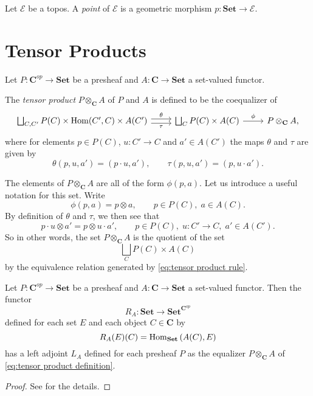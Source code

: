 \begin{definition}
\label{def:point of a topos}
Let $\mathscr{E}$ be a topos. A \emph{point} of $\mathscr{E}$ is a geometric morphism $p : \mathbf{Set} \to \mathscr{E}$.
\end{definition}

\section{Tensor Products} %
\label{sub:tensor_products}
Let $P : \mathbf{C}^{op} \to \mathbf{Set}$ be a presheaf and $A : \mathbf{C} \to \mathbf{Set}$ a set-valued functor.

\begin{definition}
\label{def:tensor product}
The \emph{tensor product} $P \otimes_{\mathbf{C}} A$ of $P$ and $A$ is defined to be the coequalizer of
\begin{equation}
\label{eq:tensor product definition}
\begin{tikzcd}
\bigsqcup_{C,C'} P(C) \times \Hom(C',C) \times A(C') \arrow[shift left=0.25em]{r}{\theta} \arrow[swap, shift right=0.25em]{r}{\tau} & \bigsqcup_{C} P(C) \times A(C) \arrow{r}{\phi} & P \otimes_{\mathbf{C}} A,
\end{tikzcd}
\end{equation}
where for elements $p \in P(C)$, $u : C' \to C$ and $a' \in A(C')$ the maps $\theta$ and $\tau$ are given by
\[ \theta(p,u,a') = (p \cdot u, a'), \qquad \tau(p,u,a') = (p, u \cdot a'). \]
\end{definition}
The elements of $P \otimes_{\mathbf{C}} A$ are all of the form $\phi(p,a)$. Let us introduce a useful notation for this set. Write
\[ \phi(p,a) = p \otimes a, \qquad p \in P(C), \; a \in A(C). \]
By definition of $\theta$ and $\tau$, we then see that
\begin{equation}
\label{eq:tensor product rule}
p \cdot u \otimes a' = p \otimes u \cdot a', \qquad p \in P(C), \; u : C' \to C, \; a' \in A(C').
\end{equation}
So in other words, the set $P \otimes_{\mathbf{C}} A$ is the quotient of the set
\[ \bigsqcup_{C} P(C) \times A(C) \]
by the equivalence relation generated by \cref{eq:tensor product rule}.

\begin{theorem}
\label{thm:hom-tensor-adjunction}
Let $P : \mathbf{C}^{op} \to \mathbf{Set}$ be a presheaf and $A : \mathbf{C} \to \mathbf{Set}$ a set-valued functor. Then the functor
\[ R_A : \mathbf{Set} \to \mathbf{Set}^{\mathbf{C}^{op}} \]
defined for each set $E$ and each object $C \in \mathbf{C}$ by
\[ R_A(E)(C) = \operatorname{Hom}_{\mathbf{Set}}\left(A(C), E \right) \]
has a left adjoint $L_A$ defined for each presheaf $P$ as the equalizer $P \otimes_{\mathbf{C}} A$ of \cref{eq:tensor product definition}.
\end{theorem}
\begin{proof}
See \cite[Theorem VII.2.1]{MacLaneMoerdijk91} for the details.
\end{proof}

